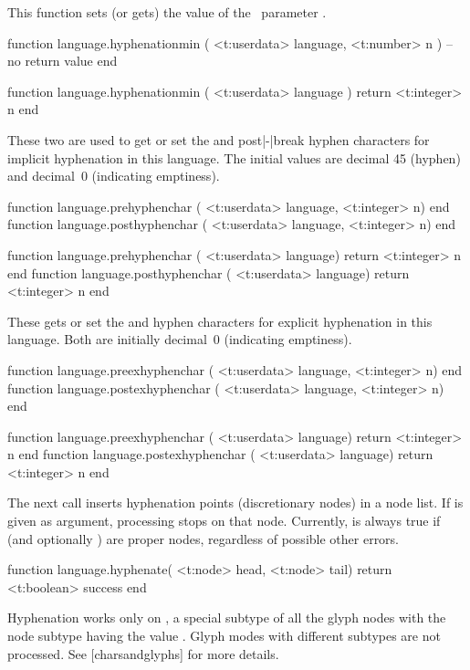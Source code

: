 This function sets (or gets) the value of the \TEX\ parameter
\type {\hyphenationmin}.

\starttyping [option=LUA]
function language.hyphenationmin ( <t:userdata> language, <t:number> n )
    -- no return value
end
\stoptyping

\starttyping [option=LUA]
function language.hyphenationmin ( <t:userdata> language )
    return <t:integer> n
end
\stoptyping

These two are used to get or set the  and \quote
{post|-|break} hyphen characters for implicit hyphenation in this language. The
initial values are decimal 45 (hyphen) and decimal~0 (indicating emptiness).

\starttyping [option=LUA]
function language.prehyphenchar  ( <t:userdata> language, <t:integer> n) end
function language.posthyphenchar ( <t:userdata> language, <t:integer> n) end

function language.prehyphenchar  ( <t:userdata> language) return <t:integer> n end
function language.posthyphenchar ( <t:userdata> language) return <t:integer> n end
\stoptyping

These gets or set the  and  hyphen
characters for explicit hyphenation in this language. Both are initially
decimal~0 (indicating emptiness).

\starttyping [option=LUA]
function language.preexhyphenchar  ( <t:userdata> language, <t:integer> n) end
function language.postexhyphenchar ( <t:userdata> language, <t:integer> n) end

function language.preexhyphenchar  ( <t:userdata> language) return <t:integer> n end
function language.postexhyphenchar ( <t:userdata> language) return <t:integer> n end
\stoptyping

The next call inserts hyphenation points (discretionary nodes) in a node list. If
 is given as argument, processing stops on that node. Currently,
 is always true if  (and optionally ) are
proper nodes, regardless of possible other errors.

\starttyping [option=LUA]
function language.hyphenate( <t:node> head, <t:node> tail)
    return <t:boolean> success
end
\stoptyping

Hyphenation works only on , a special subtype of all the glyph
nodes with the node subtype having the value . Glyph modes with
different subtypes are not processed. See  [charsandglyphs] for more
details.

